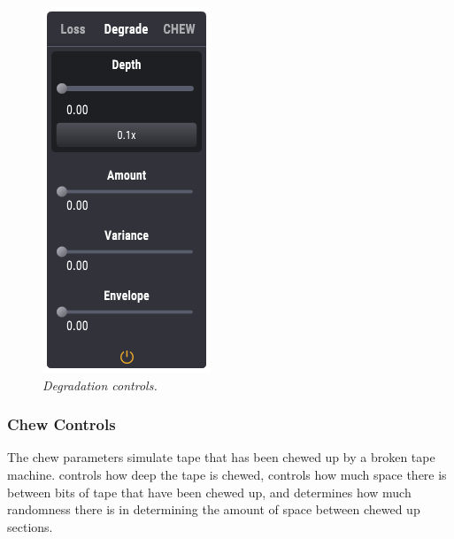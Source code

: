 \documentclass[landscape,twocolumn,a5paper]{manual}
\begin{document}
\begin{figure}[ht]
    \center
    \includegraphics[height=0.32\paperheight]{../Plugin/Screenshots/Degrade.png}
    \caption{\label{h_bias}{\it Degradation controls.}}
\end{figure}

\subsubsection{Chew Controls}
The chew parameters simulate tape that has been chewed up by
a broken tape machine.  controls how deep the
tape is chewed,  controls how much space
there is between bits of tape that have been chewed up, and
 determines how much randomness there is
in determining the amount of space between chewed up sections.
\end{document}
